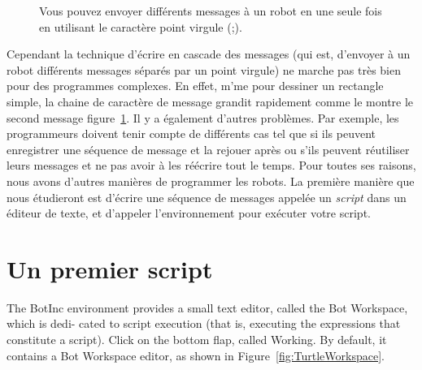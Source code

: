 \documentclass[a4paper,10pt,twoside]{book}
\begin{document}
\begin{figure}[!h]
\caption{Vous pouvez envoyer diff\'erents messages \`a un robot en une seule fois en utilisant le caract\`ere point virgule (;). \label{fig:cascading}}
\end{figure}

Cependant la technique d'\'ecrire en cascade des messages (qui est, d'envoyer \`a un robot diff\'erents messages s\'epar\'es par un point virgule) ne marche pas tr\`es bien pour des programmes complexes. En effet, m'me pour dessiner un rectangle simple, la chaine de caract\`ere de message grandit rapidement comme le montre le second message figure~\ref{fig:cascading}. Il y a \'egalement d'autres probl\`emes. Par exemple, les programmeurs doivent tenir compte de diff\'erents cas tel que si ils peuvent enregistrer une s\'equence de message et la rejouer apr\`es ou s'ils peuvent r\'eutiliser leurs messages et ne pas avoir \`a les r\'e\'ecrire tout le temps. Pour toutes ses raisons, nous avons d'autres mani\`eres de programmer les robots. La premi\`ere mani\`ere que nous \'etudieront est d'\'ecrire une s\'equence de messages appel\'ee un \emph{script} dans un \'editeur de texte, et d'appeler l'environnement pour ex\'ecuter votre script.

\section{Un premier script}

The BotInc environment provides a small text editor, called the Bot Workspace, which is dedi- 
cated to script execution (that is, executing the expressions that constitute a script). Click on the bottom flap, called Working. By default, it contains a Bot Workspace editor, as shown in Figure~\ref{fig:TurtleWorkspace}. 
\end{document}
